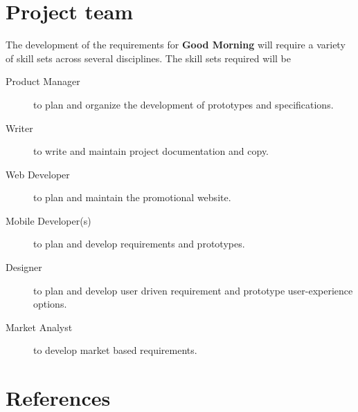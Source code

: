 \documentclass[11pt]{article}
\begin{document}
%
\section{Project team}\label{project-team}

The development of the requirements for \textbf{Good Morning} will require a variety of skill sets across several disciplines. The skill sets required will be

\begin{description}
  \item[Product Manager] to plan and organize the development of prototypes and specifications.
  \item[Writer] to write and maintain project documentation and copy.
  \item[Web Developer] to plan and maintain the promotional website.
  \item[Mobile Developer(s)] to plan and develop requirements and prototypes.
  \item[Designer] to plan and develop user driven requirement and prototype user-experience options.
  \item[Market Analyst] to develop market based requirements.
\end{description}



    
 
    \pagebreak
    \section{References} 
    
    

    
    
    \pagebreak
%  


%
%
%
\end{document}
